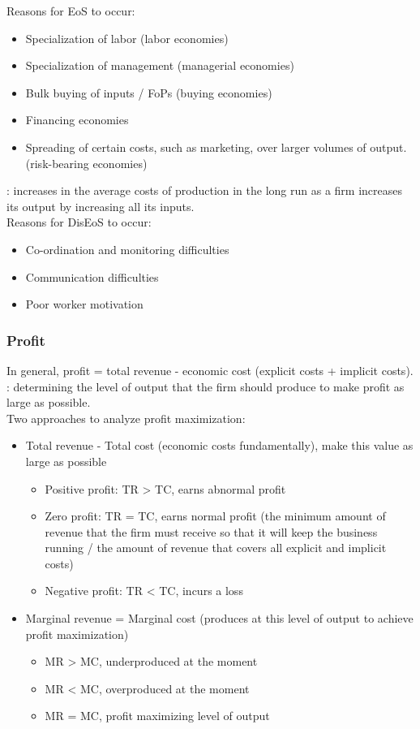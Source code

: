 Reasons for EoS to occur:
\begin{itemize}
  \item Specialization of labor (labor economies)
  \item Specialization of management (managerial economies)
  \item Bulk buying of inputs / FoPs (buying economies)
  \item Financing economies
  \item Spreading of certain costs, such as marketing, over larger volumes of output. (risk-bearing economies)
\end{itemize}
: increases in the average costs of production in the long run as a firm increases its output by increasing all its inputs.\\
Reasons for DisEoS to occur: 
\begin{itemize}
  \item Co-ordination and monitoring difficulties
  \item Communication difficulties
  \item Poor worker motivation
\end{itemize}
\subsubsection*{Profit}
In general, profit = total revenue - economic cost (explicit costs + implicit costs).\\
: determining the level of output that the firm should produce to make profit as large as possible.\\
Two approaches to analyze profit maximization:
\begin{itemize}
  \item Total revenue - Total cost (economic costs fundamentally), make this value as large as possible
  \begin{itemize}
    \item Positive profit: TR > TC, earns abnormal profit
    \item Zero profit: TR = TC, earns normal profit (the minimum amount of revenue that the firm must receive so that it will keep the business running / the amount of revenue that covers all explicit and implicit costs)
    \item Negative profit: TR < TC, incurs a loss
  \end{itemize}
  \item Marginal revenue = Marginal cost (produces at this level of output to achieve profit maximization)
  \begin{itemize}
    \item MR > MC, underproduced at the moment
    \item MR < MC, overproduced at the moment
    \item MR = MC, profit maximizing level of output
  \end{itemize}
\end{itemize}
